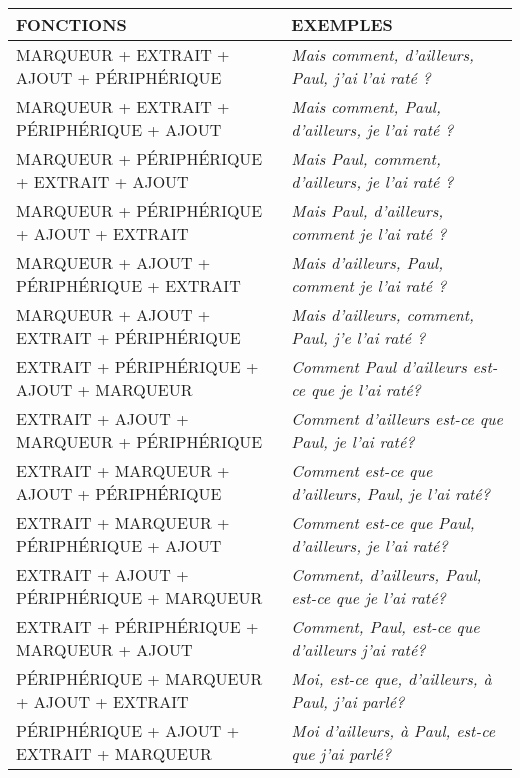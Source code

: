 \documentclass[UTF8]{report}
\begin{document}
\begin{table}[H]
    \centering
    \begin{adjustbox}{max width =\textwidth}
        \begin{tabular}{|l|p{}|} %
        \hline
        \rowcolor{cyan!20}
        \textbf{FONCTIONS} & \textbf{EXEMPLES} \\
        \hline
        MARQUEUR + EXTRAIT + AJOUT + PÉRIPHÉRIQUE & \textit{Mais comment, d'ailleurs, Paul, j'ai l'ai raté ?} \\
        MARQUEUR + EXTRAIT + PÉRIPHÉRIQUE + AJOUT & \textit{Mais comment, Paul, d'ailleurs, je l'ai raté ?} \\
        MARQUEUR + PÉRIPHÉRIQUE + EXTRAIT + AJOUT & \textit{Mais Paul, comment, d'ailleurs, je l'ai raté ?} \\
        MARQUEUR + PÉRIPHÉRIQUE + AJOUT + EXTRAIT & \textit{Mais Paul, d'ailleurs, comment je l'ai raté ?} \\
        MARQUEUR + AJOUT + PÉRIPHÉRIQUE + EXTRAIT & \textit{Mais d'ailleurs, Paul, comment je l'ai raté ?} \\
        MARQUEUR + AJOUT + EXTRAIT + PÉRIPHÉRIQUE & \textit{Mais d'ailleurs, comment, Paul, j'e l'ai raté ?} \\
        \hline
        EXTRAIT + PÉRIPHÉRIQUE + AJOUT + MARQUEUR & \textit{Comment Paul d'ailleurs est-ce que je l'ai raté?} \\
        EXTRAIT + AJOUT + MARQUEUR + PÉRIPHÉRIQUE & \textit{Comment d'ailleurs est-ce que Paul, je l'ai raté?} \\
        EXTRAIT + MARQUEUR + AJOUT + PÉRIPHÉRIQUE & \textit{Comment est-ce que d'ailleurs, Paul, je l'ai raté?} \\
        EXTRAIT + MARQUEUR + PÉRIPHÉRIQUE + AJOUT & \textit{Comment est-ce que Paul, d'ailleurs, je l'ai raté?} \\
        EXTRAIT + AJOUT + PÉRIPHÉRIQUE + MARQUEUR & \textit{Comment, d'ailleurs, Paul, est-ce que je l'ai raté?} \\
        EXTRAIT + PÉRIPHÉRIQUE + MARQUEUR + AJOUT & \textit{Comment, Paul, est-ce que d'ailleurs j'ai raté?} \\
        \hline
        PÉRIPHÉRIQUE + MARQUEUR + AJOUT + EXTRAIT & \textit{Moi, est-ce que, d'ailleurs, à Paul, j'ai parlé?} \\
        PÉRIPHÉRIQUE + AJOUT + EXTRAIT + MARQUEUR & \textit{Moi d'ailleurs, à Paul, est-ce que j'ai parlé?} \\

\end{tabular}
\end{adjustbox}
\end{table}
\end{document}
